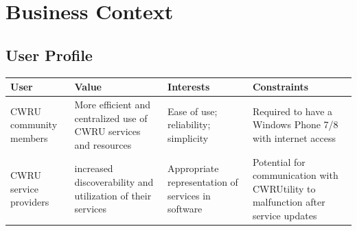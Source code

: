 \documentclass[pdftex,12pt,letter]{article}
\begin{document}
\section{Business Context}
\subsection{User Profile}
\begin{table}[h]
\begin{tabularx}{\textwidth}[t]{|Y|Y|Y|Y|}
\hline
\bfseries User & \bfseries Value & \bfseries Interests & \bfseries Constraints\\ \hline
CWRU community members & More efficient and centralized use of CWRU services and resources & Ease of use; reliability; simplicity & Required to have a Windows Phone 7/8 with internet access \\ \hline
CWRU service providers & increased discoverability and utilization of their services & Appropriate representation of services in software & Potential for communication with CWRUtility to malfunction after service updates \\ \hline
\end{tabularx}
\end{table}

\end{document}
